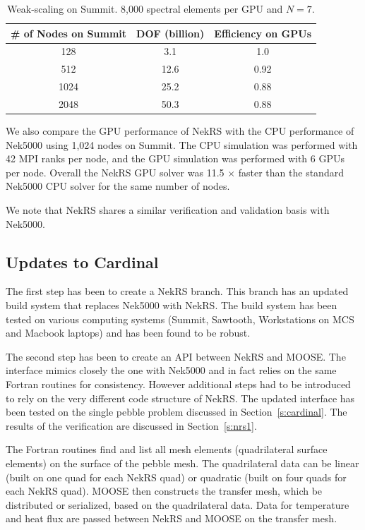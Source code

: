 \begin{table} [!b]
\begin{center} \begin{tabular}{ccc}
\toprule
\# of Nodes on Summit & DOF (billion) &  Efficiency on GPUs \\
\midrule
 128  & 3.1  & 1.0   \\
 512  & 12.6 & 0.92  \\
 1024 & 25.2 & 0.88  \\
 2048 & 50.3 & 0.88 \\
\bottomrule \end{tabular} \end{center}
\caption{\label{wscaling} Weak-scaling on Summit. 8,000 spectral elements per GPU and $N=7$.}
\end{table}

We also compare the GPU performance of NekRS with the CPU performance of Nek5000 using 1,024 nodes on Summit. The CPU simulation was performed with 42 MPI ranks per node, and the GPU simulation was performed with 6 GPUs  per node. Overall the NekRS GPU solver was 11.5 $\times$ faster than the standard Nek5000 CPU solver for the same number of nodes.

We note that NekRS shares a similar verification and validation basis with Nek5000.

\subsection{Updates to Cardinal}

The first step has been to create a NekRS branch. This branch has an updated build system that replaces Nek5000 with NekRS. The build system has been tested on various computing systems (Summit, Sawtooth, Workstations on MCS and Macbook laptops) and has been found to be robust.

The second step has been to create an API between NekRS and MOOSE. The interface mimics closely the one with Nek5000 and in fact relies on the same Fortran routines for consistency. However additional steps had to be introduced to rely on the very different code structure of NekRS. The updated interface has been tested on the single pebble problem discussed in Section~\ref{s:cardinal}. The results of the verification are discussed in Section~\ref{s:nrs1}.

The Fortran routines find and list all mesh elements (quadrilateral surface elements) on the surface of the pebble mesh. The quadrilateral data can be linear (built on one quad for each NekRS quad) or quadratic (built on four quads for each NekRS quad). MOOSE then constructs the transfer mesh, which be distributed or serialized, based on the quadrilateral data. Data for temperature and heat flux are passed between NekRS and MOOSE on the transfer mesh.

